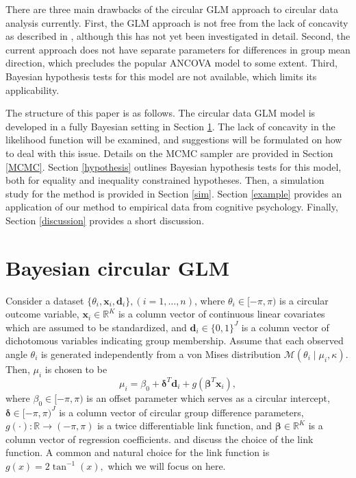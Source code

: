 \documentclass[11pt,a4paper]{article}\usepackage[]{graphicx}\usepackage[]{color}
\newcommand{\bx}{\boldsymbol{x}}
\newcommand{\bd}{\boldsymbol{d}}
\newcommand{\bdt}{\boldsymbol{\delta}}
\newcommand{\bbt}{\boldsymbol{\beta}}
\begin{document}
There are three main drawbacks of the circular GLM approach  to circular data analysis currently. First, the GLM approach is not free from the lack of concavity as described in \citet{gill2010}, although this has not yet been investigated in detail. Second, the current approach does not have separate parameters for differences in group mean direction, which precludes the popular ANCOVA model to some extent. Third, Bayesian hypothesis tests for this model are not available, which limits its applicability.

The structure of this paper is as follows. The circular data GLM model is developed in a fully Bayesian setting in Section \ref{themodel}. The lack of concavity in the likelihood function will be examined, and suggestions will be formulated on how to deal with this issue. Details on the MCMC sampler are provided in Section \ref{MCMC}. Section \ref{hypothesis} outlines Bayesian hypothesis tests for this model, both for equality and inequality constrained hypotheses. Then, a simulation study for the method is provided in Section \ref{sim}. Section \ref{example} provides an application of our method to empirical data from cognitive psychology. Finally, Section \ref{discussion} provides a short discussion.




\section{Bayesian circular GLM}

\label{themodel}

Consider a dataset \( \{ \theta_i, \bx_i, \bd_i \}, (i = 1, \dots, n) \), where \( \theta_i \in [-\pi, \pi) \) is a circular outcome variable, \( \bx_i \in \mathbb{R}^K \) is a column vector of continuous linear covariates which are assumed to be standardized, and \( \bd_i \in \{0, 1\}^J \) is a column vector of dichotomous variables indicating group membership. Assume that each observed angle $\theta_i$ is generated independently from a von Mises distribution \( \mathcal{M}(\theta_i \mid \mu_i, \kappa) \). Then, \( \mu_i \) is chosen to be
\begin{equation}
\mu_i = \beta_0 + \bdt^T \bd_i + g(\bbt^T \bx_i),
\end{equation}
where \( \beta_0 \in [-\pi, \pi) \) is an offset parameter which serves as a circular intercept, \( \bdt \in [-\pi, \pi)^J \) is a column vector of circular group difference parameters, \( g(\cdot) : \mathbb{R} \rightarrow (-\pi, \pi) \) is a twice differentiable link function, and \(\bbt \in \mathbb{R}^K \) is a column vector of regression coefficients. \citet{jammalamadaka2001topics} and \citet{fisher1992regression} discuss the choice of the link function. A common and natural choice for the link function is \( g(x) = 2 \tan^{-1}(x),\) which we will focus on here.
\end{document}
